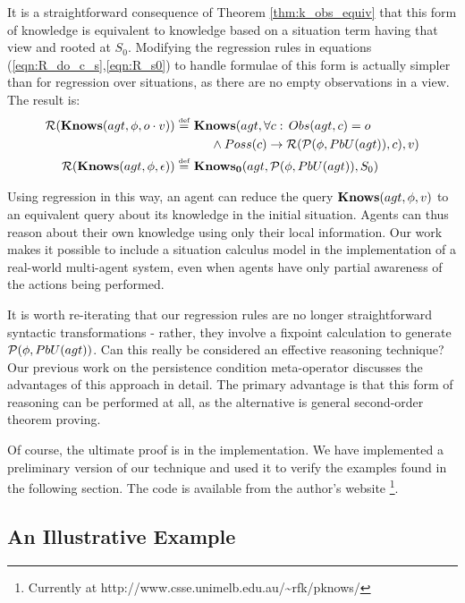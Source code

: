 It is a straightforward consequence of Theorem \ref{thm:k_obs_equiv}
that this form of knowledge is equivalent to knowledge based on a
situation term having that view and rooted at $S_{0}$. Modifying
the regression rules in equations (\ref{eqn:R_do_c_s},\ref{eqn:R_s0})
to handle formulae of this form is actually simpler than for regression
over situations, as there are no empty observations in a view. The
result is:\begin{align*}
\mathcal{R}(\mathbf{Knows}(agt,\phi,o\cdot v))\stackrel{\mbox{\tiny def}}{=}\,\, & \mathbf{Knows}(agt,\forall c:\, Obs(agt,c)=o\\
 & \,\,\,\,\,\,\,\,\wedge Poss(c)\rightarrow\mathcal{R}(\mathcal{P}(\phi,PbU(agt)),c),v)\\
\mathcal{R}(\mathbf{Knows}(agt,\phi,\epsilon))\stackrel{\mbox{\tiny def}}{=}\,\, & \mathbf{Knows_{0}}(agt,\mathcal{P}(\phi,PbU(agt)),S_{0})\end{align*}


Using regression in this way, an agent can reduce the query $\mathbf{Knows}(agt,\phi,v)$
to an equivalent query about its knowledge in the initial situation.
Agents can thus reason about their own knowledge using only their
local information. Our work makes it possible to include a situation
calculus model in the implementation of a real-world multi-agent system,
even when agents have only partial awareness of the actions being
performed.

It is worth re-iterating that our regression rules are no longer straightforward
syntactic transformations - rather, they involve a fixpoint calculation
to generate $\mathcal{P}(\phi,PbU(agt))$. Can this really be considered
an effective reasoning technique? Our previous work on the persistence
condition meta-operator \citep{kelly07sc_persistence} discusses the
advantages of this approach in detail. The primary advantage is that
this form of reasoning can be performed at all, as the alternative
is general second-order theorem proving.

Of course, the ultimate proof is in the implementation. We have implemented
a preliminary version of our technique and used it to verify the examples
found in the following section. The code is available from the author's
website%
\footnote{Currently at http://www.csse.unimelb.edu.au/\textasciitilde{}rfk/pknows/%
}.


\subsection{An Illustrative Example\label{sub:An-Illustrative-Example}}

